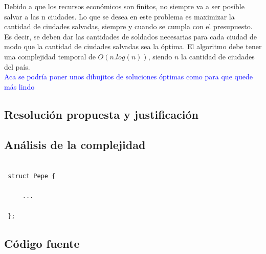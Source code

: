 \documentclass[a4paper]{article}
\begin{document}
Debido a que los recursos econ\'omicos son finitos, no siempre va a ser posible salvar a las n ciudades. Lo que se desea en este problema es maximizar la cantidad de ciudades salvadas, siempre y cuando se cumpla con el presupuesto. Es decir, se deben dar las cantidades de soldados necesarias para cada ciudad de modo que la cantidad de ciudades salvadas sea la \'optima.  El algoritmo debe tener una complejidad temporal de $O(n.log(n))$, siendo $n$ la cantidad de ciudades del pa\'is.\\

\textcolor{blue}{Aca se podr\'ia poner unos dibujitos de soluciones \'optimas como para que quede m\'as lindo}




\subsection{Resoluci\'on propuesta y justificaci\'on}



\subsection{An\'alisis de la complejidad}

 \begin{codesnippet}
 \begin{verbatim}

 struct Pepe {

     ...

 };

 \end{verbatim}
 \end{codesnippet}

\newpage

\subsection{C\'odigo fuente}
\end{document}
